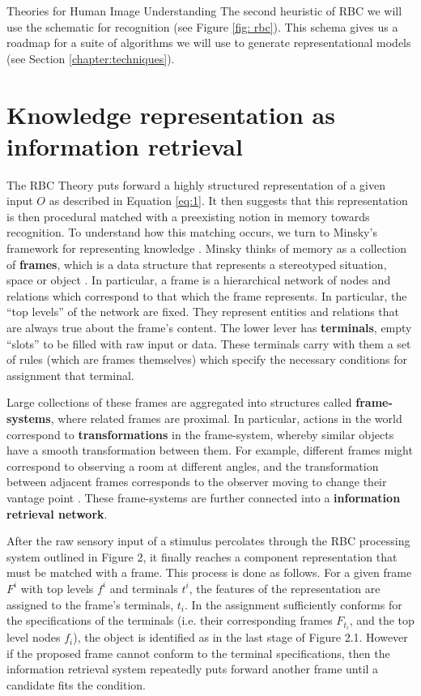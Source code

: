 \documentclass[12pt]{pom_thesis}
\begin{document}
\begin{chapter}{Theories for Human Image Understanding}
The second heuristic of RBC we will use the schematic for recognition (see Figure \ref{fig: rbc}). This schema gives us a roadmap for a suite of algorithms we will use to generate representational models (see Section \ref{chapter:techniques}). 
\section{Knowledge representation as information retrieval}
The RBC Theory puts forward a highly structured representation of a given input $O$ as described in Equation \ref{eq:1}. It then suggests that this representation is then procedural matched with a preexisting notion in memory towards recognition. To understand how this matching occurs, we turn to Minsky's framework for representing knowledge \cite{minsky1975framework}. Minsky thinks of memory as a collection of \textbf{frames}, which is a data structure that represents a stereotyped situation, space or object \cite{minsky1975framework}. In particular, a frame is a hierarchical network of nodes and relations which correspond to that which the frame represents. In particular, the ``top levels'' of the network are fixed. They represent entities and relations that are always true about the frame's content. The lower lever has \textbf{terminals}, empty ``slots'' to be filled with raw input or data. These terminals carry with them a set of rules (which are frames themselves) which specify the necessary conditions for assignment that terminal. 

Large collections of these frames are aggregated into structures called \textbf{frame-systems}, where related frames are proximal. In particular, actions in the world correspond to \textbf{transformations} in the frame-system, whereby similar objects have a smooth transformation between them. For example, different frames might correspond to observing a room at different angles, and the transformation between adjacent frames corresponds to the observer moving to change their vantage point \cite{minsky1975framework}. These frame-systems are further connected into a \textbf{information retrieval network}. 

After the raw sensory input of a stimulus percolates through the RBC processing system outlined in Figure 2, it finally reaches a component representation that must be matched with a frame. This process is done as follows. For a given frame $F^i$ with top levels $f^i$ and terminals $t^i$, the features of the representation are assigned to the frame's terminals, $t_i$. In the assignment sufficiently conforms for the specifications of the terminals (i.e. their corresponding frames $F_{t_i}$, and the top level nodes $f_i$), the object is identified as in the last stage of Figure 2.1. However if the proposed frame cannot conform to the terminal specifications, then the information retrieval system repeatedly puts forward another frame until a candidate fits the condition.


\end{chapter}
\end{document}
